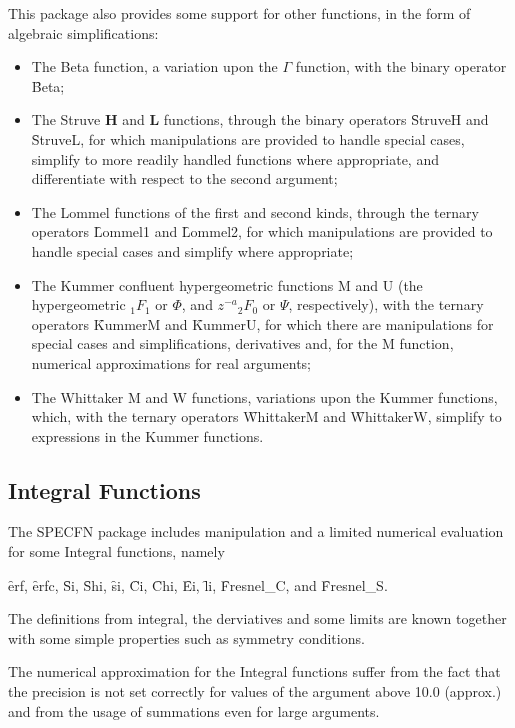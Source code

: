 This package also provides some support for other functions, in the form
of algebraic simplifications:
\begin{itemize}
\item The Beta function, a variation upon the $\Gamma$
function\cite{AbramowitzStegun:72}, with the binary operator \f{Beta};
\item The Struve \textbf{H} and \textbf{L} functions, through the binary
operators \f{StruveH} and \f{StruveL}, for which manipulations are
provided to handle special cases, simplify to more readily handled
functions where appropriate, and differentiate with respect to the second
argument;
\item The Lommel functions of the first and second kinds, through the
ternary operators \f{Lommel1} and \f{Lommel2}, for which manipulations
are provided to handle special cases and simplify where appropriate;
\item The Kummer confluent hypergeometric functions M and U (the
hypergeometric ${_1F_1}$ or $\Phi$, and $z^{-a}{_2F_0}$ or $\Psi$,
respectively),
with the ternary operators \f{KummerM} and \f{KummerU}, for which
there are manipulations for special cases and simplifications, derivatives
and, for the M function, numerical approximations for real arguments;
\item The Whittaker M and W functions, variations upon the Kummer
functions, which, with the ternary operators \f{WhittakerM} and 
\f{WhittakerW}, simplify to expressions in the Kummer functions.
\end{itemize}

\subsection{Integral Functions}

The SPECFN package includes manipulation and a limited numerical
evaluation for some Integral functions, namely

\f{erf}, \f{erfc}, \f{Si}, \f{Shi}, \f{si}, \f{Ci}, \f{Chi}, \f{Ei}, \f{li},  
\f{Fresnel\_C}, and \f{Fresnel\_S}.

The definitions from integral, the derviatives and some limits are
known together with some simple properties such as symmetry
conditions.

The numerical approximation for the Integral functions suffer
from the fact that the precision is not set correctly for
values of the argument above 10.0 (approx.) and from the
usage of summations even for large arguments.

